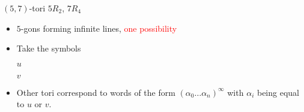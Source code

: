 \documentclass[%
pdf,
colorBG,
slideColor,
]{prosper}
\begin{document}
\begin{slide}{$(5,7)$-tori $5R_2$, $7R_4$}
\begin{itemize}
\item $5$-gons forming infinite lines, \textcolor{red}{one possibility}
\begin{center}
\begin{minipage}{5.2cm}
\centering
{}\par
\end{minipage}
\end{center}
\item Take the symbols
\begin{center}
\begin{minipage}{5.2cm}
\centering
{}\par
$u$
\end{minipage}
\begin{minipage}{5.2cm}
\centering
{}\par
$v$
\end{minipage}
\end{center}
\item Other tori correspond to words of the form $(\alpha_0\dots\alpha_n)^{\infty}$ with $\alpha_i$ being equal to $u$ or $v$.


\end{itemize}
\end{slide}
\end{document}
